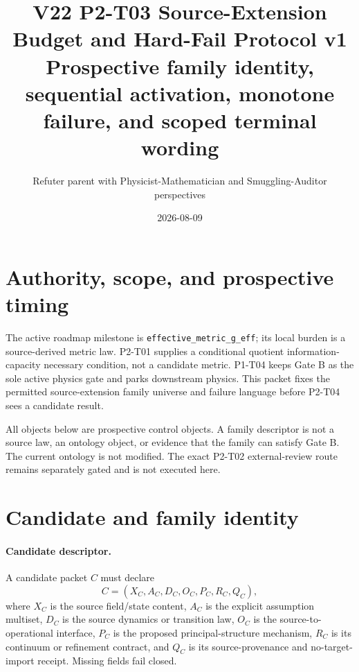 \documentclass[11pt]{article}
\title{V22 P2-T03 Source-Extension Budget and Hard-Fail Protocol v1\\
\large Prospective family identity, sequential activation, monotone failure, and scoped terminal wording}
\author{Refuter parent with Physicist-Mathematician and Smuggling-Auditor perspectives}
\date{2026-08-09}
\begin{document}
\sloppy
\maketitle

\begin{center}
\end{center}

\section{Authority, scope, and prospective timing}

The active roadmap milestone is \texttt{effective\_metric\_g\_eff}; its local
burden is a source-derived metric law. P2-T01 supplies a conditional quotient
information-capacity necessary condition, not a candidate metric. P1-T04 keeps
Gate B as the sole active physics gate and parks downstream physics. This
packet fixes the permitted source-extension family universe and failure
language before P2-T04 sees a candidate result.

All objects below are prospective control objects. A family descriptor is not
a source law, an ontology object, or evidence that the family can satisfy Gate
B. The current ontology is not modified. The exact P2-T02 external-review
route remains separately gated and is not executed here.

\section{Candidate and family identity}

\paragraph{Candidate descriptor.}
A candidate packet $C$ must declare
\[
 C=(X_C,A_C,D_C,O_C,P_C,R_C,Q_C),
\]
where $X_C$ is the source field/state content, $A_C$ is the explicit
assumption multiset, $D_C$ is the source dynamics or transition law, $O_C$ is
the source-to-operational interface, $P_C$ is the proposed principal-structure
mechanism, $R_C$ is its continuum or refinement contract, and $Q_C$ is its
source-provenance and no-target-import receipt. Missing fields fail closed.
\end{document}
